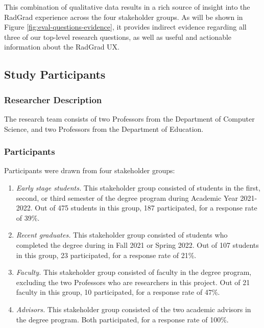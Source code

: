 \documentclass[acmsmall]{acmart}
\begin{document}
This combination of qualitative data results in a rich source of insight into the RadGrad experience across the four stakeholder groups. As will be shown in Figure \ref{fig:eval-questions-evidence}, it provides indirect evidence regarding all three of our top-level research questions, as well as useful and actionable information about the RadGrad UX.

\subsection{Study Participants}

\subsubsection{Researcher Description}

The research team consists of two Professors from the Department of Computer Science, and two Professors from the Department of Education.

\subsubsection{Participants}

Participants were drawn from four stakeholder groups:

\begin{enumerate}
\item {\em Early stage students.}  This stakeholder group consisted of students in the first, second, or third semester of the degree program during Academic Year 2021-2022.  Out of 475 students in this group, 187 participated, for a response rate of 39\%.

\item {\em Recent graduates.}  This stakeholder group consisted of students who completed the degree during in Fall 2021 or Spring 2022. Out of 107 students in this group, 23 participated, for a response rate of 21\%.

\item {\em Faculty.} This stakeholder group consisted of faculty in the degree program, excluding the two Professors who are researchers in this project.  Out of 21 faculty in this group, 10 participated, for a response rate of 47\%.

\item {\em Advisors.} This stakeholder group consisted of the two academic advisors in the degree program.  Both participated, for a response rate of 100\%.

\end{enumerate}
\end{document}
